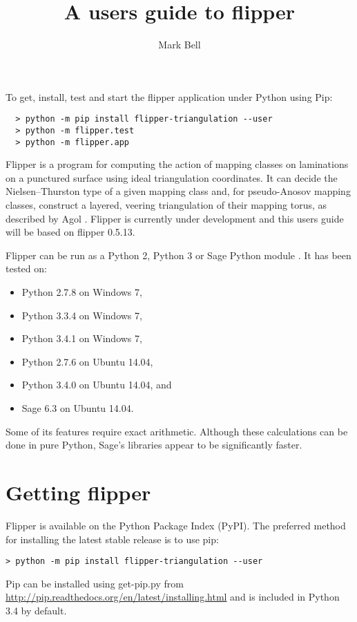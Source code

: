 \documentclass[a4paper]{article}
\title{A users guide to flipper}
\author{Mark Bell}
\begin{document}
\maketitle

\begin{center}
\begin{minipage}{0.8\linewidth}
\begin{framed}
  To get, install, test and start the flipper application under Python using Pip:
  \begin{lstlisting}
  > python -m pip install flipper-triangulation --user
  > python -m flipper.test
  > python -m flipper.app
  \end{lstlisting}
\end{framed}
\end{minipage}
\end{center}

Flipper is a program for computing the action of mapping classes on laminations on a punctured surface using ideal triangulation coordinates. It can decide the Nielsen--Thurston type of a given mapping class and, for pseudo-Anosov mapping classes, construct a layered, veering triangulation of their mapping torus, as described by Agol \cite{Agol}. Flipper is currently under development and this users guide will be based on flipper 0.5.13.


Flipper can be run as a Python 2, Python 3 or Sage Python module \cite{sage}. It has been tested on:
\begin{itemize}
 \item Python 2.7.8 on Windows 7,
 \item Python 3.3.4 on Windows 7,
 \item Python 3.4.1 on Windows 7,
 \item Python 2.7.6 on Ubuntu 14.04,
 \item Python 3.4.0 on Ubuntu 14.04, and
 \item Sage 6.3 on Ubuntu 14.04.
\end{itemize}
Some of its features require exact arithmetic. Although these calculations can be done in pure Python, Sage's libraries appear to be significantly faster.

\section{Getting flipper}

Flipper is available on the Python Package Index (PyPI). The preferred method for installing the latest stable release is to use pip:
\begin{lstlisting}
> python -m pip install flipper-triangulation --user
\end{lstlisting}
Pip can be installed using get-pip.py from \url{http://pip.readthedocs.org/en/latest/installing.html} and is included in Python 3.4 by default.
\end{document}
